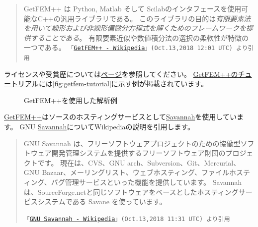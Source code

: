 \documentclass{../../style/ltjoc}
\begin{document}
\begin{quote}
GetFEM++ は Python, Matlab そして Scilabのインタフェースを使用可能なC++の汎用ライブラリである。
このライブラリの目的は\emph{有限要素法を用いて線形および非線形偏微分方程式を解くためのフレームワークを提供することである}。
有限要素近似や数値積分法の選択の柔軟性が特徴の一つである。
\texttt{「\href{https://ja.wikipedia.org/wiki/GetFEM++}{GetFEM++ - Wikipedia}」(Oct.13,2018 12:01 UTC) より引用}
\end{quote}
ライセンスや受賞歴については\href{https://ja.wikipedia.org/wiki/GetFEM++}{ページ}を参照してください。
\href{http://www.getfem.org/tutorial/index.html}{GetFEM++のチュートリアル}には\autoref{fig:getfem-tutorial}に示す例が掲載されています。
\begin{figure}
{}
\caption{GetFEM++を使用した解析例}
\label{fig:getfem-tutorial}
\end{figure}
\href{http://getfem.org}{GetFEM++}はソースのホスティングサービスとして\href{https://savannah.gnu.org}{Savannah}を使用しています。
GNU \href{https://savannah.gnu.org}{Savannah}についてWikipediaの説明を引用します。
\begin{quote}
GNU Savannah は、フリーソフトウェアプロジェクトのための協働型ソフトウェア開発管理システムを提供するフリーソフトウェア財団のプロジェクトです。
現在は、CVS、GNU arch、Subversion、Git、Mercurial、GNU Bazaar、メーリングリスト、ウェブホスティング、ファイルホスティング、バグ管理サービスといった機能を提供しています。
Savannah は、SourceForge.netと同じソフトウェアをベースとしたホスティングサービスシステムである Savane を使っています。

\texttt{「\href{https://savannah.gnu.org}{GNU Savannah - Wikipedia}」(Oct.13,2018 11:31 UTC) より引用}
\end{quote}
\end{document}

